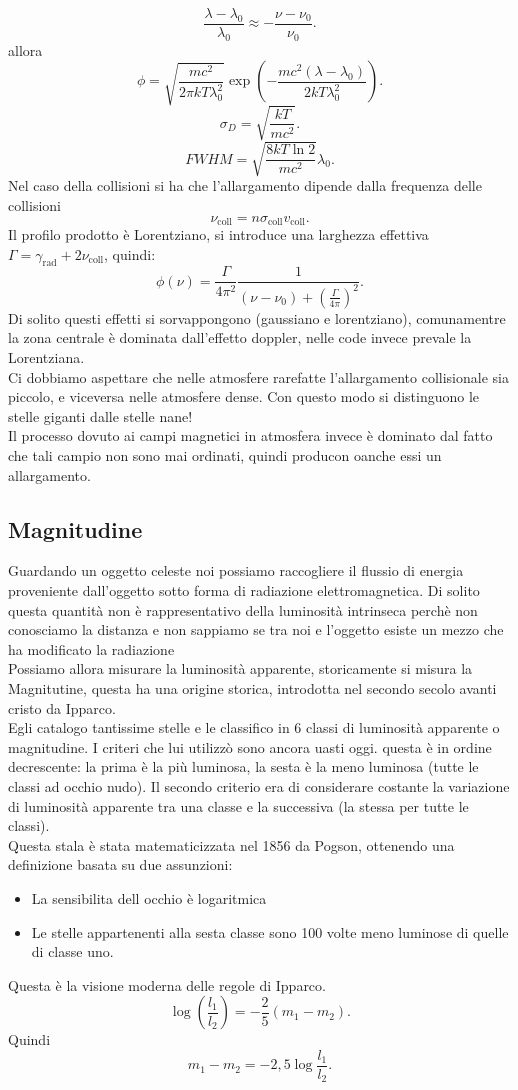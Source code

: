 \[
	\frac{\lambda - \lambda_0}{\lambda_0} \approx - \frac{\nu - \nu_0}{\nu_0}
.\] 
allora 
\[
	\phi = \sqrt{\frac{mc^2}{2\pi kT\lambda_0^2}} \exp\left( - \frac{mc^2\left( \lambda -\lambda_0 \right) }{2kT \lambda_0^2} \right) 
.\] 
\[
	\sigma_D = \sqrt{\frac{kT}{mc^2}} 
.\] 
\[
	FWHM = \sqrt{\frac{8kT \ln 2}{mc^2}} \lambda_0 
.\] 
Nel caso della collisioni si ha che l'allargamento dipende dalla frequenza delle collisioni
\[
	\nu _{\text{coll}} = n \sigma _{\text{coll}} v_{\text{coll}}
.\] 
Il profilo prodotto è Lorentziano, si introduce una larghezza effettiva $\Gamma = \gamma _{\text{rad}} + 2 \nu _{\text{coll}}$, quindi:
\[
	\phi ( \nu ) = \frac{\Gamma }{4\pi^2}\frac{1}{\left( \nu -\nu_0 \right) + \left( \frac{\Gamma }{4\pi} \right) ^2}
.\] 
Di solito questi effetti si sorvappongono (gaussiano e lorentziano), comunamentre la zona centrale è dominata dall'effetto doppler, nelle code invece prevale la Lorentziana. \\
Ci dobbiamo aspettare che nelle atmosfere rarefatte l'allargamento collisionale sia piccolo, e viceversa nelle atmosfere dense. Con questo modo si distinguono le stelle giganti dalle stelle nane!\\
Il processo dovuto ai campi magnetici in atmosfera invece è dominato dal fatto che tali campio non sono mai ordinati, quindi producon oanche essi un allargamento.\\
\subsection{Magnitudine}%
Guardando un oggetto celeste noi possiamo raccogliere il flussio di energia proveniente dall'oggetto sotto forma di radiazione elettromagnetica. Di solito questa quantità non è rappresentativo della luminosità intrinseca perchè non conosciamo la distanza e non sappiamo se tra noi e l'oggetto esiste un mezzo che ha modificato la radiazione\\
Possiamo allora misurare la luminosità apparente, storicamente si misura la Magnitutine, questa ha una origine storica, introdotta nel secondo secolo avanti cristo da Ipparco. \\
Egli catalogo tantissime stelle e le classifico in 6 classi di luminosità apparente o magnitudine. I criteri che lui utilizzò sono ancora uasti oggi. questa è in ordine decrescente: la prima è la più luminosa, la sesta è la meno luminosa (tutte le classi ad occhio nudo).
Il secondo criterio era di considerare costante la variazione di luminosità apparente tra una classe e la successiva (la stessa per tutte le classi).\\
Questa stala è stata matematicizzata nel 1856 da Pogson, ottenendo una definizione basata su due assunzioni:
\begin{itemize}
	\item La sensibilita dell occhio è logaritmica
	\item Le stelle appartenenti alla sesta classe sono 100 volte meno luminose di quelle di classe uno.
\end{itemize}
Questa è la visione moderna delle regole di Ipparco.\\
\[
	\log \left( \frac{l_1}{l_2} \right) = -\frac{2}{5}\left( m_1-m_2 \right) 
.\] 
Quindi 
\[
	m_1-m_2 = -2,5 \log \frac{l_1}{l_2}
.\] 

